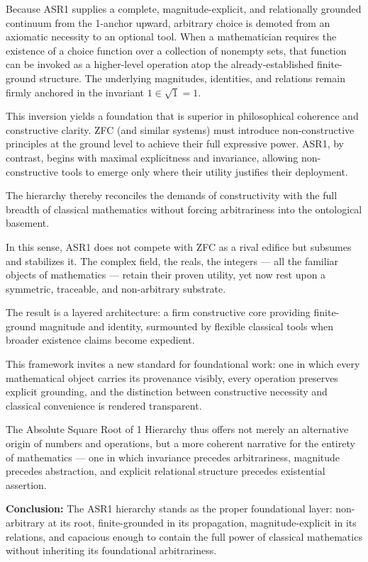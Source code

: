 \documentclass[11pt,a4paper]{article}
\begin{document}
Because ASR1 supplies a complete, magnitude-explicit, and relationally grounded continuum from the 1-anchor upward, arbitrary choice is demoted from an axiomatic necessity to an optional tool. When a mathematician requires the existence of a choice function over a collection of nonempty sets, that function can be invoked as a higher-level operation atop the already-established finite-ground structure. The underlying magnitudes, identities, and relations remain firmly anchored in the invariant $1 \in \sqrt{1} = 1$.

This inversion yields a foundation that is superior in philosophical coherence and constructive clarity. ZFC (and similar systems) must introduce non-constructive principles at the ground level to achieve their full expressive power. ASR1, by contrast, begins with maximal explicitness and invariance, allowing non-constructive tools to emerge only where their utility justifies their deployment.

The hierarchy thereby reconciles the demands of constructivity with the full breadth of classical mathematics without forcing arbitrariness into the ontological basement.

In this sense, ASR1 does not compete with ZFC as a rival edifice but subsumes and stabilizes it. The complex field, the reals, the integers --- all the familiar objects of mathematics --- retain their proven utility, yet now rest upon a symmetric, traceable, and non-arbitrary substrate.

The result is a layered architecture: a firm constructive core providing finite-ground magnitude and identity, surmounted by flexible classical tools when broader existence claims become expedient.

This framework invites a new standard for foundational work: one in which every mathematical object carries its provenance visibly, every operation preserves explicit grounding, and the distinction between constructive necessity and classical convenience is rendered transparent.

The Absolute Square Root of 1 Hierarchy thus offers not merely an alternative origin of numbers and operations, but a more coherent narrative for the entirety of mathematics --- one in which invariance precedes arbitrariness, magnitude precedes abstraction, and explicit relational structure precedes existential assertion.

\bigskip
\textbf{Conclusion:} The ASR1 hierarchy stands as the proper foundational layer: non-arbitrary at its root, finite-grounded in its propagation, magnitude-explicit in its relations, and capacious enough to contain the full power of classical mathematics without inheriting its foundational arbitrariness.
\end{document}
